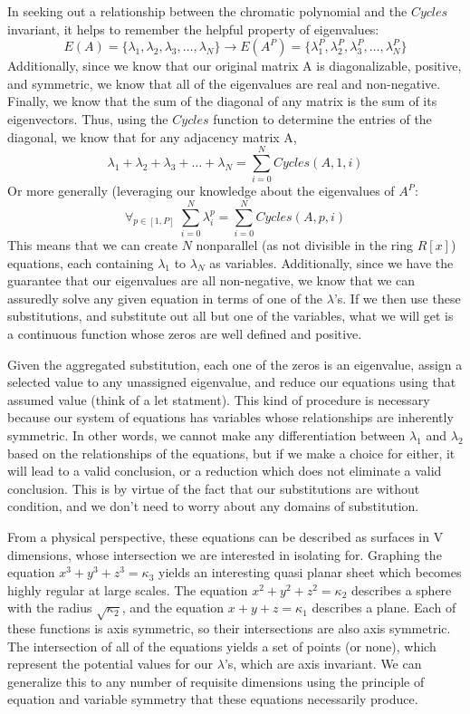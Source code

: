 In seeking out a relationship between the chromatic polynomial and the $Cycles$ invariant, it helps to remember the helpful property of  eigenvalues:
$$E(A) = \{\lambda_1,\lambda_2,\lambda_3, \dots, \lambda_N\} \rightarrow E(A^P) = \{\lambda_1^P,\lambda_2^P,\lambda_3^P, \dots, \lambda_N^P\} $$
Additionally, since we know that our original matrix A is diagonalizable, positive, and symmetric, we know that all of the eigenvalues are real and non-negative. 
Finally, we know that the sum of the diagonal of any matrix is the sum of its eigenvectors. 
Thus, using the $Cycles$ function to determine the entries of the diagonal, we know that for any adjacency matrix A,
$$\lambda_1 + \lambda_2 + \lambda_3 + \dots + \lambda_N = \sum_{i = 0}^{N}{Cycles(A, 1, i)}$$
Or more generally (leveraging our knowledge about the eigenvalues of $A^P$:
$$ \forall_{p \in [1, P]} \; \sum_{i = 0}^N{\lambda_i^p} =  \sum_{i = 0}^{N}{Cycles(A, p, i)}$$
This means that we can create $N$ nonparallel (as not divisible in the ring $R[x]$) equations, each containing $\lambda_1$ to $\lambda_N$ as variables.
Additionally, since we have the guarantee that our eigenvalues are all non-negative, we know that we can assuredly solve any given equation in terms of one of the $\lambda$'s.
If we then use these substitutions, and substitute out all but one of the variables, what we will get is a continuous function whose zeros are well defined and positive. 

Given the aggregated substitution, each one of the zeros is an eigenvalue, assign a selected value to any unassigned eigenvalue, and reduce our equations using that assumed value (think of a let statment).
This kind of procedure is necessary because our system of equations has variables whose relationships are inherently symmetric.
In other words, we cannot make any differentiation between $\lambda_1$ and $\lambda_2$ based on the relationships of the equations, but if we make a choice for either, it will lead to a valid conclusion, or a reduction which does not eliminate a valid conclusion.
This is by virtue of the fact that our substitutions are without condition, and we don't need to worry about any domains of substitution.

From a physical perspective, these equations can be described as surfaces in V dimensions, whose intersection we are interested in isolating for. 
Graphing the equation $x^3 + y^3 + z^3 = \kappa_3$ yields an interesting quasi planar sheet which becomes highly regular at large scales.  
The equation $x^2 + y^2 + z^2 = \kappa_2$ describes a sphere with the radius $\sqrt{\kappa_2}$, and the equation $x + y + z = \kappa_1$ describes a plane. 
Each of these functions is axis symmetric, so their intersections are also axis symmetric.  
The intersection of all of the equations yields a set of points (or none), which represent the potential values for our $\lambda$'s, which are axis invariant. 
We can generalize this to any number of requisite dimensions using the principle of equation and variable symmetry that these equations necessarily produce.

